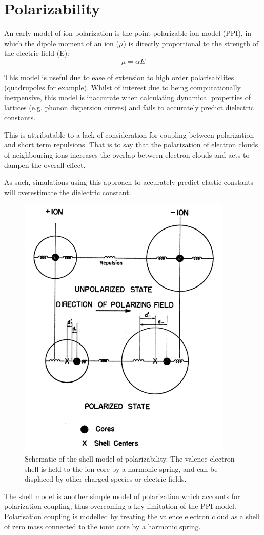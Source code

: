 \section{Polarizability}

An early model of ion polarization is the point polarizable ion model (PPI), in which the dipole moment of an ion ($\mu$) is directly proportional to the strength of the electric field (E):
\begin{equation}
\mu = \alpha E
\end{equation}

This model is useful due to ease of extension to high order polarisabilites (quadrupoles for example).
Whilst of interest due to being computationally inexpensive, this model is inaccurate when calculating dynamical properties of lattices (e.g. phonon dispersion curves) and fails to accurately predict dielectric constants.

This is attributable to a lack of consideration for coupling between polarization and short term repulsions. That is to say that the polarization of electron clouds of neighbouring ions increases the overlap between electron clouds and acts to dampen the overall effect.

As such, simulations using this approach to accurately predict elastic constants will overestimate the dielectric constant.

\begin{figure}[ht]
  \centering
  \includegraphics[width=0.4\linewidth]{figures/shell}
  \caption[Schematic of the shell model of polarizability.\cite{Dick1958}]{Schematic of the shell model of polarizability.\cite{Dick1958} The valence electron shell is held to the ion core by a harmonic spring, and can be displaced by other charged species or electric fields.}
\end{figure}
The shell model\cite{Dick1958} is another simple model of polarization which accounts for polarization coupling, thus overcoming a key limitation of the PPI model.
Polarisation coupling is modelled by treating the valence electron cloud as a shell of zero mass connected to the ionic core by a harmonic spring.

